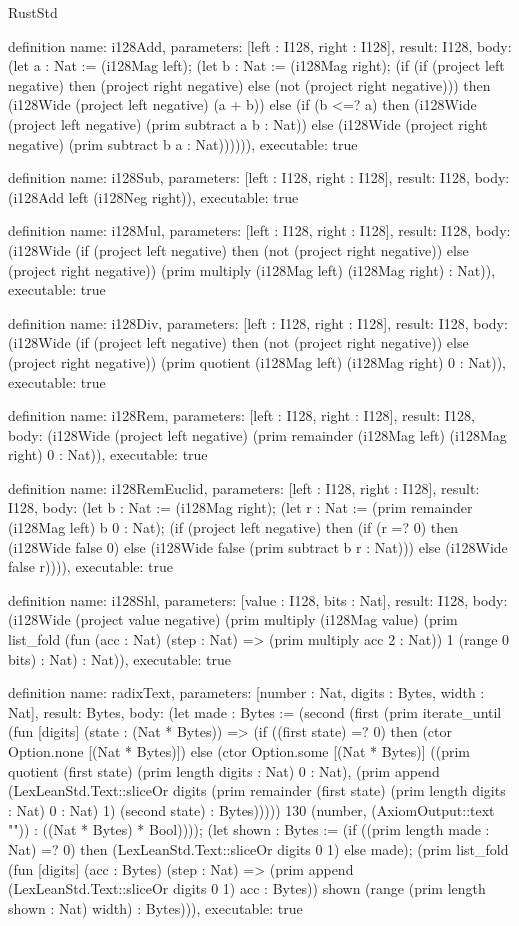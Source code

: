 \begin{lexlean}{RustStd}
\begin{semanticmodule}
definition{
  name: i128Add,
  parameters: [left : I128, right : I128],
  result: I128,
  body: (let a : Nat := (i128Mag left); (let b : Nat := (i128Mag right); (if (if (project left negative) then (project right negative) else (not (project right negative))) then (i128Wide (project left negative) (a + b)) else (if (b <=? a) then (i128Wide (project left negative) (prim subtract a b : Nat)) else (i128Wide (project right negative) (prim subtract b a : Nat)))))),
  executable: true
}

definition{
  name: i128Sub,
  parameters: [left : I128, right : I128],
  result: I128,
  body: (i128Add left (i128Neg right)),
  executable: true
}

definition{
  name: i128Mul,
  parameters: [left : I128, right : I128],
  result: I128,
  body: (i128Wide (if (project left negative) then (not (project right negative)) else (project right negative)) (prim multiply (i128Mag left) (i128Mag right) : Nat)),
  executable: true
}

definition{
  name: i128Div,
  parameters: [left : I128, right : I128],
  result: I128,
  body: (i128Wide (if (project left negative) then (not (project right negative)) else (project right negative)) (prim quotient (i128Mag left) (i128Mag right) 0 : Nat)),
  executable: true
}

definition{
  name: i128Rem,
  parameters: [left : I128, right : I128],
  result: I128,
  body: (i128Wide (project left negative) (prim remainder (i128Mag left) (i128Mag right) 0 : Nat)),
  executable: true
}

definition{
  name: i128RemEuclid,
  parameters: [left : I128, right : I128],
  result: I128,
  body: (let b : Nat := (i128Mag right); (let r : Nat := (prim remainder (i128Mag left) b 0 : Nat); (if (project left negative) then (if (r =? 0) then (i128Wide false 0) else (i128Wide false (prim subtract b r : Nat))) else (i128Wide false r)))),
  executable: true
}

definition{
  name: i128Shl,
  parameters: [value : I128, bits : Nat],
  result: I128,
  body: (i128Wide (project value negative) (prim multiply (i128Mag value) (prim list_fold (fun (acc : Nat) (step : Nat) => (prim multiply acc 2 : Nat)) 1 (range 0 bits) : Nat) : Nat)),
  executable: true
}

definition{
  name: radixText,
  parameters: [number : Nat, digits : Bytes, width : Nat],
  result: Bytes,
  body: (let made : Bytes := (second (first (prim iterate_until (fun [digits] (state : (Nat * Bytes)) => (if ((first state) =? 0) then (ctor Option.none [(Nat * Bytes)]) else (ctor Option.some [(Nat * Bytes)] ((prim quotient (first state) (prim length digits : Nat) 0 : Nat), (prim append (LexLeanStd.Text::sliceOr digits (prim remainder (first state) (prim length digits : Nat) 0 : Nat) 1) (second state) : Bytes))))) 130 (number, (AxiomOutput::text "")) : ((Nat * Bytes) * Bool)))); (let shown : Bytes := (if ((prim length made : Nat) =? 0) then (LexLeanStd.Text::sliceOr digits 0 1) else made); (prim list_fold (fun [digits] (acc : Bytes) (step : Nat) => (prim append (LexLeanStd.Text::sliceOr digits 0 1) acc : Bytes)) shown (range (prim length shown : Nat) width) : Bytes))),
  executable: true
}


\end{semanticmodule}
\end{lexlean}
